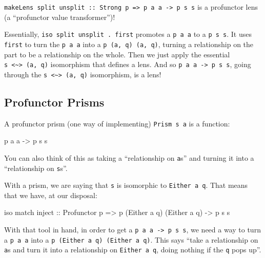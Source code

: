\documentclass[]{article}
\newenvironment{Shaded}{}{}
\newcommand{\DataTypeTok}[1]{\textcolor[rgb]{0.56,0.13,0.00}{#1}}
\newcommand{\NormalTok}[1]{#1}
\newcommand{\OtherTok}[1]{\textcolor[rgb]{0.00,0.44,0.13}{#1}}
\begin{document}
\texttt{makeLens\ split\ unsplit\ ::\ Strong\ p\ =\textgreater{}\ p\ a\ a\ -\textgreater{}\ p\ s\ s}
is a profunctor lens (a ``profunctor value transformer'')!

Essentially, \texttt{iso\ split\ unsplit\ .\ first\textquotesingle{}} promotes a
\texttt{p\ a\ a} to a \texttt{p\ s\ s}. It uses \texttt{first\textquotesingle{}}
to turn the \texttt{p\ a\ a} into a \texttt{p\ (a,\ q)\ (a,\ q)}, turning a
relationship on the part to be a relationship on the whole. Then we just apply
the essential \texttt{s\ \textless{}\textasciitilde{}\textgreater{}\ (a,\ q)}
isomorphism that defines a lens. And so
\texttt{p\ a\ a\ -\textgreater{}\ p\ s\ s}, going through the
\texttt{s\ \textless{}\textasciitilde{}\textgreater{}\ (a,\ q)} isomorphism, is
a lens!

\subsection{Profunctor Prisms}\label{profunctor-prisms}

A profunctor prism (one way of implementing)
\texttt{Prism\textquotesingle{}\ s\ a} is a function:

\begin{Shaded}
\begin{Highlighting}[]
\NormalTok{p a a }\OtherTok{{-}\textgreater{}}\NormalTok{ p s s}
\end{Highlighting}
\end{Shaded}

You can also think of this as taking a ``relationship on \texttt{a}s'' and
turning it into a ``relationship on \texttt{s}s''.

With a prism, we are saying that \texttt{s} is isomorphic to
\texttt{Either\ a\ q}. That means that we have, at our disposal:

\begin{Shaded}
\begin{Highlighting}[]
\NormalTok{iso match inject}
\OtherTok{    ::} \DataTypeTok{Profunctor}\NormalTok{ p}
    \OtherTok{=\textgreater{}}\NormalTok{ p (}\DataTypeTok{Either}\NormalTok{ a q) (}\DataTypeTok{Either}\NormalTok{ a q)}
    \OtherTok{{-}\textgreater{}}\NormalTok{ p s s}
\end{Highlighting}
\end{Shaded}

With that tool in hand, in order to get a
\texttt{p\ a\ a\ -\textgreater{}\ p\ s\ s}, we need a way to turn a
\texttt{p\ a\ a} into a \texttt{p\ (Either\ a\ q)\ (Either\ a\ q)}. This says
``take a relationship on \texttt{a}s and turn it into a relationship on
\texttt{Either\ a\ q}, doing nothing if the \texttt{q} pops up''.
\end{document}
